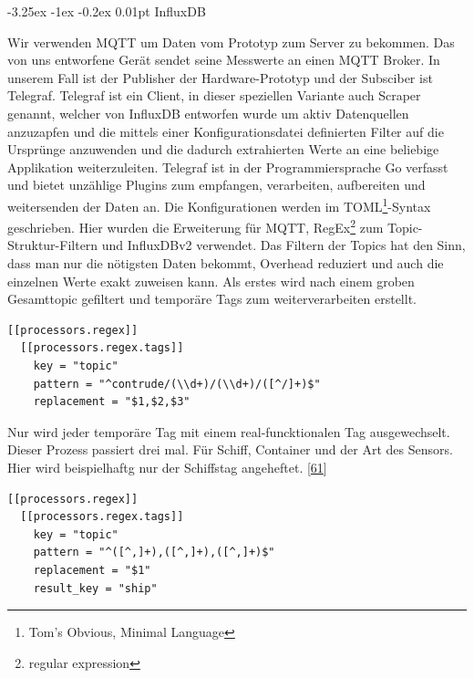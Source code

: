 \documentclass[
    headings=optiontotocandhead,%
    twoside,
    numbers=noenddot,%
    12pt, %
    titlepage, %
    parskip=full, %
    listof=leveldown, 
    numbers=noenddot, %
    a4paper,DIV=14,
    BCOR=15mm,
]{scrbook}
\makeatletter
\renewcommand\paragraph{\@startsection{paragraph}{4}{\z@}%
    {-3.25ex \@plus -1ex \@minus -0.2ex}%
    {0.01pt}%
    {\raggedsection\normalfont\sectfont\nobreak\size@paragraph}%
  }
\makeatother
\begin{document}
\hypertarget{influxdb}{%
\paragraph{InfluxDB}\label{influxdb}}

Wir verwenden MQTT um Daten vom Prototyp zum Server zu bekommen. Das von
uns entworfene Gerät sendet seine Messwerte an einen MQTT Broker. In
unserem Fall ist der Publisher der Hardware-Prototyp und der Subsciber
ist Telegraf. Telegraf ist ein Client, in dieser speziellen Variante
auch Scraper genannt, welcher von InfluxDB entworfen wurde um aktiv
Datenquellen anzuzapfen und die mittels einer Konfigurationsdatei
definierten Filter auf die Ursprünge anzuwenden und die dadurch
extrahierten Werte an eine beliebige Applikation weiterzuleiten.
Telegraf ist in der Programmiersprache Go verfasst und bietet unzählige
Plugins zum empfangen, verarbeiten, aufbereiten und weitersenden der
Daten an. Die Konfigurationen werden im TOML\footnote{Tom's Obvious,
  Minimal Language}-Syntax geschrieben. Hier wurden die Erweiterung für
MQTT, RegEx\footnote{regular expression} zum Topic-Struktur-Filtern und
InfluxDBv2 verwendet. Das Filtern der Topics hat den Sinn, dass man nur
die nötigsten Daten bekommt, Overhead reduziert und auch die einzelnen
Werte exakt zuweisen kann. Als erstes wird nach einem groben Gesamttopic
gefiltert und temporäre Tags zum weiterverarbeiten erstellt.

\begin{lstlisting}[caption={Filtern der Topics in Telegraf mittels Regex}]
[[processors.regex]]
  [[processors.regex.tags]]
    key = "topic"
    pattern = "^contrude/(\\d+)/(\\d+)/([^/]+)$"
    replacement = "$1,$2,$3"
\end{lstlisting}

Nur wird jeder temporäre Tag mit einem real-funcktionalen Tag
ausgewechselt. Dieser Prozess passiert drei mal. Für Schiff, Container
und der Art des Sensors. Hier wird beispielhaftg nur der Schiffstag
angeheftet. {[}\protect\hyperlink{ref-gpt-telegraf-regex}{61}{]}

\begin{lstlisting}[caption={Ersetzen der temporären Topic-Tags durch funcktionale Tags}]
[[processors.regex]]
  [[processors.regex.tags]]
    key = "topic"
    pattern = "^([^,]+),([^,]+),([^,]+)$"
    replacement = "$1"
    result_key = "ship"
\end{lstlisting}
\end{document}
